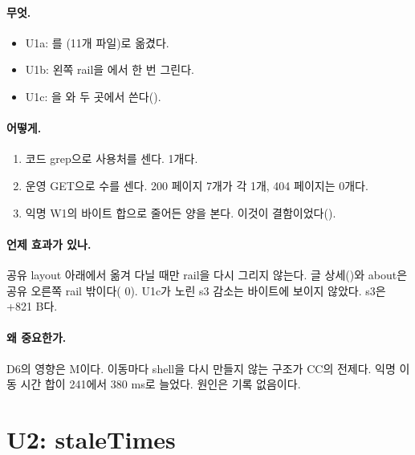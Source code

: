 \paragraph{무엇.}
\begin{itemize}[nosep]
  \item U1a: 를 (11개 파일)로 옮겼다.
  \item U1b: 왼쪽 rail을 에서 한 번 그린다.
  \item U1c: 을 와  두 곳에서 쓴다().
\end{itemize}

\paragraph{어떻게.}
\begin{enumerate}[nosep]
  \item 코드 grep으로  사용처를 센다.  1개다.
  \item 운영 GET으로  수를 센다. 200 페이지 7개가 각 1개, 404 페이지는 0개다.
  \item 익명 W1의  바이트 합으로 줄어든 양을 본다. 이것이 결함이었다().
\end{enumerate}

\paragraph{언제 효과가 있나.}
공유 layout 아래에서 옮겨 다닐 때만 rail을 다시 그리지 않는다.
글 상세()와 about은 공유 오른쪽 rail 밖이다( 0).
U1c가 노린 s3 감소는 바이트에 보이지 않았다. s3은 +821 B다.

\paragraph{왜 중요한가.}
D6의 영향은 M이다. 이동마다 shell을 다시 만들지 않는 구조가 CC의 전제다.
익명 이동 시간 합이 241에서 380 ms로 늘었다. 원인은 기록 없음이다.

\section{U2: staleTimes}\label{sec:re-u2}

